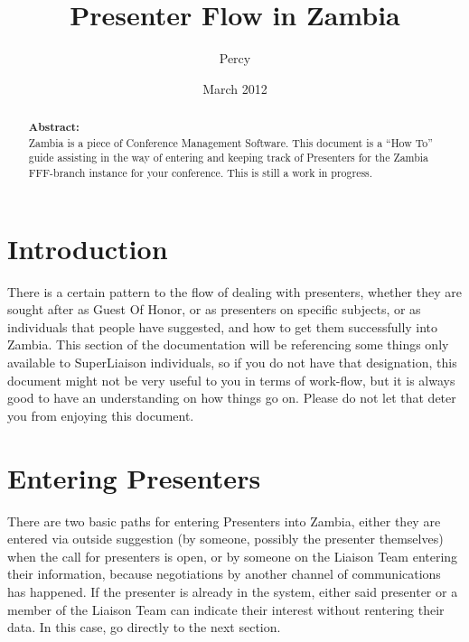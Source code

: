 \documentclass[tablesignature]{scrartcl}
\title{Presenter Flow in Zambia}
\author{Percy}
\date{March 2012}
\begin{document}
\maketitle


\thispagestyle{fancy}
\renewcommand{\headrulewidth}{0pt}
\renewcommand{\footrulewidth}{1pt}
\lhead{}
\rhead{}
\chead{}
\cfoot{}
\rfoot{\thepage}
\begin{abstract}
\vspace{5cm}
{\LARGE{\textbf{Abstract:\\}}}
Zambia is a piece of Conference Management Software.  This document is a ``How To'' guide assisting in the way of entering and keeping track of Presenters for the Zambia FFF-branch instance for your conference.  This is still a work in progress.
\end{abstract}
\newpage
\renewcommand{\headrulewidth}{1pt}
\tableofcontents
\listoftables
\listoffigures
\newpage
{}
\section{Introduction}
\label{sec-1}


  There is a certain pattern to the flow of dealing with presenters,
  whether they are sought after as Guest Of Honor, or as presenters on
  specific subjects, or as individuals that people have suggested, and
  how to get them successfully into Zambia.  This section of the
  documentation will be referencing some things only available to
  SuperLiaison individuals, so if you do not have that designation,
  this document might not be very useful to you in terms of work-flow,
  but it is always good to have an understanding on how things go on.
  Please do not let that deter you from enjoying this document.
\section{Entering Presenters}
\label{sec-2}


  There are two basic paths for entering Presenters into Zambia,
  either they are entered via outside suggestion (by someone, possibly
  the presenter themselves) when the call for presenters is open, or
  by someone on the Liaison Team entering their information, because
  negotiations by another channel of communications has happened.  If
  the presenter is already in the system, either said presenter or a
  member of the Liaison Team can indicate their interest without
  rentering their data. In this case, go directly to the next section.
\end{document}
